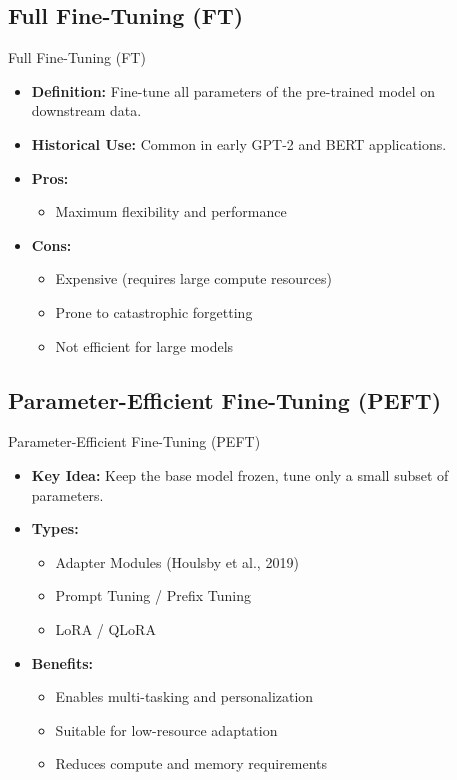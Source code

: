\subsection{Full Fine-Tuning (FT)}
\begin{frame}{Full Fine-Tuning (FT)}
    \begin{itemize}
        \item \textbf{Definition:} Fine-tune all parameters of the pre-trained model on downstream data.
        \item \textbf{Historical Use:} Common in early GPT-2 and BERT applications.
        \item \textbf{Pros:}
        \begin{itemize}
            \item Maximum flexibility and performance
        \end{itemize}
        \item \textbf{Cons:}
        \begin{itemize}
            \item Expensive (requires large compute resources)
            \item Prone to catastrophic forgetting
            \item Not efficient for large models
        \end{itemize}
    \end{itemize}
\end{frame}


\subsection{Parameter-Efficient Fine-Tuning (PEFT)}
\begin{frame}{Parameter-Efficient Fine-Tuning (PEFT)}
    \begin{itemize}
        \item \textbf{Key Idea:} Keep the base model frozen, tune only a small subset of parameters.
        \item \textbf{Types:}
        \begin{itemize}
            \item Adapter Modules (Houlsby et al., 2019)
            \item Prompt Tuning / Prefix Tuning
            \item LoRA / QLoRA
        \end{itemize}
        \item \textbf{Benefits:}
        \begin{itemize}
            \item Enables multi-tasking and personalization
            \item Suitable for low-resource adaptation
            \item Reduces compute and memory requirements
        \end{itemize}
    \end{itemize}
\end{frame}


